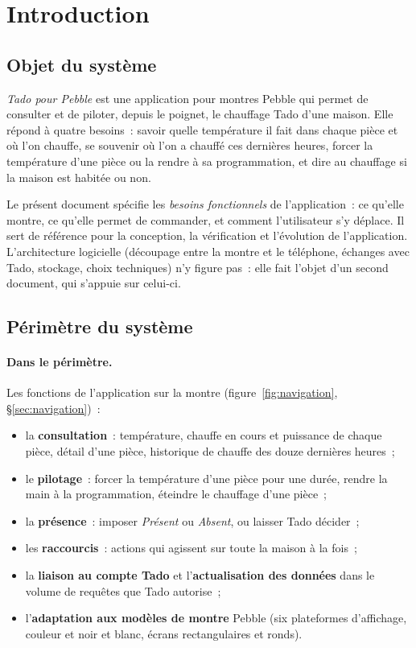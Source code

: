 \section{Introduction}

\subsection{Objet du système}

\emph{Tado pour Pebble} est une application pour montres Pebble qui permet de consulter et de
piloter, depuis le poignet, le chauffage Tado d'une maison. Elle répond à quatre besoins~:
savoir quelle température il fait dans chaque pièce et où l'on chauffe, se souvenir où l'on
a chauffé ces dernières heures, forcer la température d'une pièce ou la rendre à sa
programmation, et dire au chauffage si la maison est habitée ou non.

Le présent document spécifie les \emph{besoins fonctionnels} de l'application~: ce qu'elle
montre, ce qu'elle permet de commander, et comment l'utilisateur s'y déplace. Il sert de
référence pour la conception, la vérification et l'évolution de l'application. L'architecture
logicielle (découpage entre la montre et le téléphone, échanges avec Tado, stockage,
choix techniques) n'y figure pas~: elle fait l'objet d'un second document, qui s'appuie sur
celui-ci.

\subsection{Périmètre du système}

\paragraph{Dans le périmètre.} Les fonctions de l'application sur la montre
(figure~\ref{fig:navigation}, §\ref{sec:navigation})~:
\begin{itemize}
  \item la \textbf{consultation}~: température, chauffe en cours et puissance de chaque
        pièce, détail d'une pièce, historique de chauffe des douze dernières heures~;
  \item le \textbf{pilotage}~: forcer la température d'une pièce pour une durée, rendre la
        main à la programmation, éteindre le chauffage d'une pièce~;
  \item la \textbf{présence}~: imposer \emph{Présent} ou \emph{Absent}, ou laisser Tado
        décider~;
  \item les \textbf{raccourcis}~: actions qui agissent sur toute la maison à la fois~;
  \item la \textbf{liaison au compte Tado} et l'\textbf{actualisation des données} dans le
        volume de requêtes que Tado autorise~;
  \item l'\textbf{adaptation aux modèles de montre} Pebble (six plateformes d'affichage,
        couleur et noir et blanc, écrans rectangulaires et ronds).
\end{itemize}


